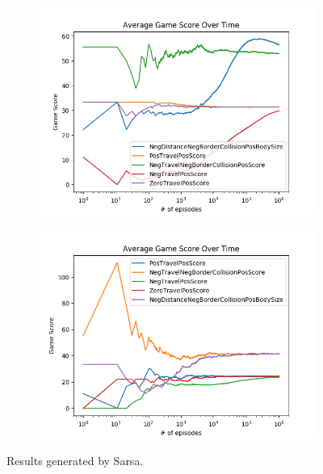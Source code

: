\documentclass[result.tex]{subfiles}
\begin{document}
    \begin{figure}[ht]
        \centering
        \begin{subfigure}[b]{.8\linewidth}
            \includegraphics[width=\linewidth]{../images/sarsa/reward/42/reward_sarsa_board_state_average_game_score_over_time.png}
        \end{subfigure}

        \begin{subfigure}[b]{.8\linewidth}
            \includegraphics[width=\linewidth]{../images/sarsa/reward/42/reward_sarsa_directional_state_average_game_score_over_time.png}
        \end{subfigure}
        \caption{Results generated by Sarsa.}
        \label{fig:reward_result_sarsa}
    \end{figure}
\end{document}
